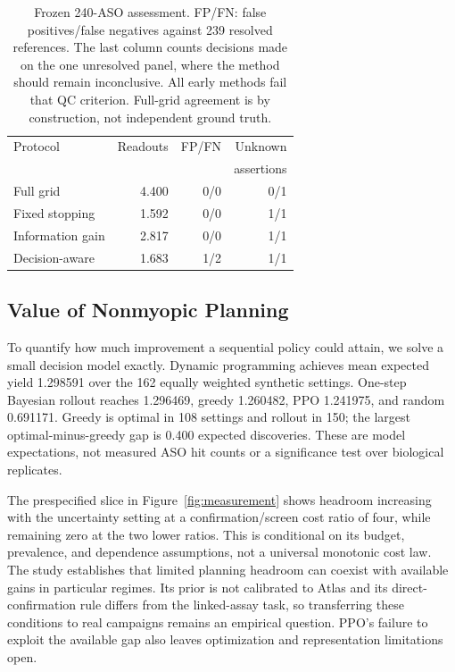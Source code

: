 \documentclass[letterpaper]{article}
\begin{document}
\begin{table}[t]
\centering
\begin{tabular}{lrrr}
\toprule
Protocol &Readouts&FP/FN&Unknown\\
&&&assertions\\
\midrule
Full grid&4.400&0/0&0/1\\
Fixed stopping&1.592&0/0&1/1\\
Information gain&2.817&0/0&1/1\\
Decision-aware&1.683&1/2&1/1\\
\bottomrule
\end{tabular}
\caption{Frozen 240-ASO assessment. FP/FN: false positives/false negatives against 239 resolved references. The last column counts decisions made on the one unresolved panel, where the method should remain inconclusive. All early methods fail that QC criterion. Full-grid agreement is by construction, not independent ground truth.}
\label{tab:dose}
\end{table}

\subsection{Value of Nonmyopic Planning}
To quantify how much improvement a sequential policy could attain, we solve a small decision model exactly. Dynamic programming achieves mean expected yield 1.298591 over the 162 equally weighted synthetic settings. One-step Bayesian rollout reaches 1.296469, greedy 1.260482, PPO 1.241975, and random 0.691171. Greedy is optimal in 108 settings and rollout in 150; the largest optimal-minus-greedy gap is 0.400 expected discoveries. These are model expectations, not measured ASO hit counts or a significance test over biological replicates.

The prespecified slice in Figure~\ref{fig:measurement} shows headroom increasing with the uncertainty setting at a confirmation/screen cost ratio of four, while remaining zero at the two lower ratios. This is conditional on its budget, prevalence, and dependence assumptions, not a universal monotonic cost law. The study establishes that limited planning headroom can coexist with available gains in particular regimes. Its prior is not calibrated to Atlas and its direct-confirmation rule differs from the linked-assay task, so transferring these conditions to real campaigns remains an empirical question. PPO's failure to exploit the available gap also leaves optimization and representation limitations open.
\end{document}
